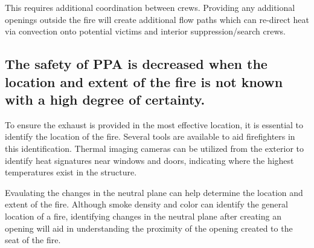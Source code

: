 \documentclass{article}
\begin{document}
This requires additional coordination between crews. Providing any additional openings outside the fire will create additional flow paths which can re-direct heat via convection onto potential victims and interior suppression/search crews. 

\subsection{The safety of PPA is decreased when the location and extent of the fire is not known with a high degree of certainty.}
To ensure the exhaust is provided in the most effective location, it is essential to identify the location of the fire. Several tools are available to aid firefighters in this identification. Thermal imaging cameras can be utilized from the exterior to identify heat signatures near windows and doors, indicating where the highest temperatures exist in the structure. 

Evaulating the changes in the neutral plane can help determine the location and extent of the fire. Although smoke density and color can identify the general location of a fire, identifying changes in the neutral plane after creating an opening will aid in understanding the proximity of the opening created to the seat of the fire. 
\end{document}
